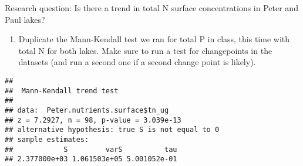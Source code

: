 \documentclass[]{article}
\newenvironment{Shaded}{\begin{snugshade}}{\end{snugshade}}
\newcommand{\KeywordTok}[1]{\textcolor[rgb]{0.13,0.29,0.53}{\textbf{#1}}}
\newcommand{\DecValTok}[1]{\textcolor[rgb]{0.00,0.00,0.81}{#1}}
\newcommand{\StringTok}[1]{\textcolor[rgb]{0.31,0.60,0.02}{#1}}
\newcommand{\OperatorTok}[1]{\textcolor[rgb]{0.81,0.36,0.00}{\textbf{#1}}}
\newcommand{\NormalTok}[1]{#1}
\providecommand{\tightlist}{%
  \setlength{\itemsep}{0pt}\setlength{\parskip}{0pt}}
\begin{document}
Research question: Is there a trend in total N surface concentrations in
Peter and Paul lakes?

\begin{enumerate}
\def\labelenumi{\arabic{enumi}.}
\setcounter{enumi}{3}
\tightlist
\item
  Duplicate the Mann-Kendall test we ran for total P in class, this time
  with total N for both lakes. Make sure to run a test for changepoints
  in the datasets (and run a second one if a second change point is
  likely).
\end{enumerate}

\begin{Shaded}
\end{Shaded}

\begin{verbatim}
## 
##  Mann-Kendall trend test
## 
## data:  Peter.nutrients.surface$tn_ug
## z = 7.2927, n = 98, p-value = 3.039e-13
## alternative hypothesis: true S is not equal to 0
## sample estimates:
##            S         varS          tau 
## 2.377000e+03 1.061503e+05 5.001052e-01
\end{verbatim}

\begin{Shaded}
\end{Shaded}
\end{document}
